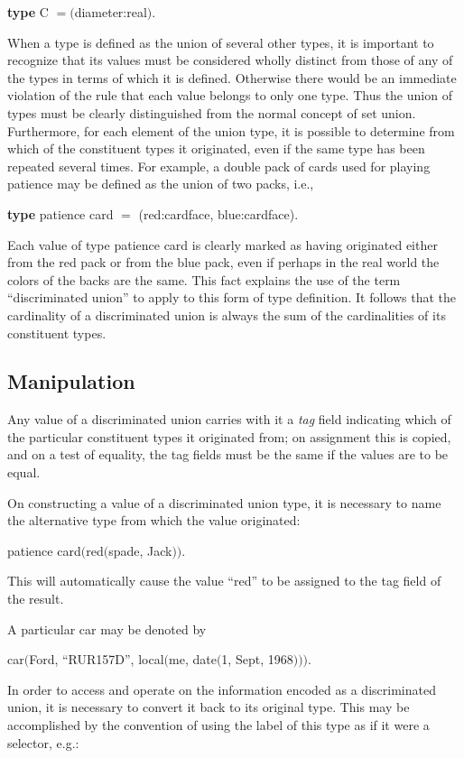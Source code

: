 \quad \textbf{type} C $= ($diameter:real$)$.

When a type is defined as the union of several other types, it is important to recognize that its values must be considered wholly distinct from those of any of the types in terms of which it is defined. Otherwise there would be an immediate violation of the rule that each value belongs to only one type. Thus the union of types must be clearly distinguished from the normal concept of set union. Furthermore, for each element of the union type, it is possible to determine from which of the constituent types it originated, even if the same type has been repeated several times. For example, a double pack of cards used for playing patience may be defined as the union of two packs, i.e.,

\quad \textbf{type} patience card $=$ (red:cardface, blue:cardface).

\noindent
Each value of type patience card is clearly marked as having originated either from the red pack or from the blue pack, even if perhaps in the real world the colors of the backs are the same. This fact explains the use of the term ``discriminated union'' to apply to this form of type definition. It follows that the cardinality of a discriminated union is always the sum of the cardinalities of its constituent types.

\subsection{Manipulation}

Any value of a discriminated union carries with it a \textit{tag} field indicating which of the particular constituent types it originated from; on assignment this is copied, and on a test of equality, the tag fields must be the same if the values are to be equal.

On constructing a value of a discriminated union type, it is necessary to name the alternative type from which the value originated:
\smallskip

\quad patience card$($red$($spade, Jack$))$.
\smallskip

\noindent
This will automatically cause the value ``red'' to be assigned to the tag field of the result.

A particular car may be denoted by
\smallskip

\quad car$($Ford, ``RUR157D'', local$($me, date$($1, Sept, 1968$)))$.
\smallskip

In order to access and operate on the information encoded as a discriminated union, it is necessary to convert it back to its original type. This may be accomplished by the convention of using the label of this type as if it were a selector, e.g.:

